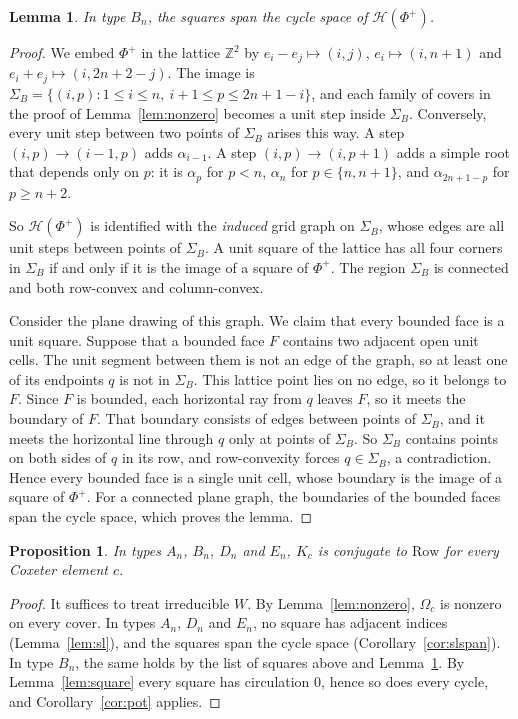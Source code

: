 \documentclass[11pt]{amsart}
\newtheorem{lemma}[theorem]{Lemma}
\newtheorem{proposition}[theorem]{Proposition}
\theoremstyle{definition}
\newcommand{\Row}{\mathrm{Row}}
\newcommand{\Hasse}{\mathcal H}
\begin{document}
\begin{lemma}\label{lem:grid}
In type $B_n$, the squares span the cycle space of $\Hasse(\Phi^+)$.
\end{lemma}

\begin{proof}
We embed $\Phi^+$ in the lattice $\mathbb Z^2$ by $e_i-e_j\mapsto(i,j)$, $e_i\mapsto(i,n+1)$ and $e_i+e_j\mapsto(i,2n+2-j)$. The image is $\Sigma_B=\{(i,p):1\le i\le n,\ i+1\le p\le 2n+1-i\}$, and each family of covers in the proof of Lemma~\ref{lem:nonzero} becomes a unit step inside $\Sigma_B$. Conversely, every unit step between two points of $\Sigma_B$ arises this way. A step $(i,p)\to(i-1,p)$ adds $\alpha_{i-1}$. A step $(i,p)\to(i,p+1)$ adds a simple root that depends only on $p$: it is $\alpha_p$ for $p<n$, $\alpha_n$ for $p\in\{n,n+1\}$, and $\alpha_{2n+1-p}$ for $p\ge n+2$.

So $\Hasse(\Phi^+)$ is identified with the \emph{induced} grid graph on $\Sigma_B$, whose edges are all unit steps between points of $\Sigma_B$. A unit square of the lattice has all four corners in $\Sigma_B$ if and only if it is the image of a square of $\Phi^+$. The region $\Sigma_B$ is connected and both row-convex and column-convex.

Consider the plane drawing of this graph. We claim that every bounded face is a unit square. Suppose that a bounded face $F$ contains two adjacent open unit cells. The unit segment between them is not an edge of the graph, so at least one of its endpoints $q$ is not in $\Sigma_B$. This lattice point lies on no edge, so it belongs to $F$. Since $F$ is bounded, each horizontal ray from $q$ leaves $F$, so it meets the boundary of $F$. That boundary consists of edges between points of $\Sigma_B$, and it meets the horizontal line through $q$ only at points of $\Sigma_B$. So $\Sigma_B$ contains points on both sides of $q$ in its row, and row-convexity forces $q\in\Sigma_B$, a contradiction. Hence every bounded face is a single unit cell, whose boundary is the image of a square of $\Phi^+$. For a connected plane graph, the boundaries of the bounded faces span the cycle space, which proves the lemma.
\end{proof}

\begin{proposition}\label{prop:AB}
In types $A_n$, $B_n$, $D_n$ and $E_n$, $K_c$ is conjugate to $\Row$ for every Coxeter element $c$.
\end{proposition}

\begin{proof}
It suffices to treat irreducible $W$. By Lemma~\ref{lem:nonzero}, $\Omega_c$ is nonzero on every cover. In types $A_n$, $D_n$ and $E_n$, no square has adjacent indices (Lemma~\ref{lem:sl}), and the squares span the cycle space (Corollary~\ref{cor:slspan}). In type $B_n$, the same holds by the list of squares above and Lemma~\ref{lem:grid}. By Lemma~\ref{lem:square} every square has circulation $0$, hence so does every cycle, and Corollary~\ref{cor:pot} applies.
\end{proof}
\end{document}
